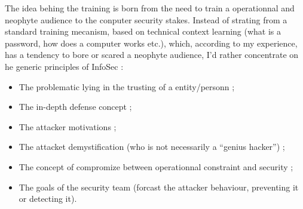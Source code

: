 \documentclass[11pt]{article} %
\begin{document}
The idea behing the training is born from the need to train a
operationnal and neophyte audience to the conputer security
stakes. Instead of strating from a standard training mecanism,
based on technical context learning (what is a password, how
does a computer works etc.), which, according to my experience,
has a tendency to bore or scared a neophyte audience, I'd rather
concentrate on he generic principles of InfoSec :
\begin{itemize}
\item The problematic lying in the trusting of a entity/personn
; 
\item The in-depth defense concept ; 
\item The attacker
motivations ; 
\item The attacket demystification (who is not
necessarily a ``genius hacker'') ; 
\item The concept of
compromize between operationnal constraint and security ; 
\item The goals of the security team (forcast the attacker behaviour,
preventing it or detecting it). 
\end{itemize}
\end{document}
